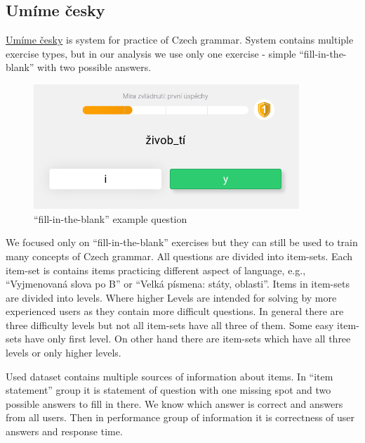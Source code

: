 \documentclass[
  digital, %
  table,   %
  nolof,     %
  nolot,     %
  nocover
]{fithesis3}
\begin{document}
\subsection{Umíme česky}\label{umime-cesky}


\href{https://umimecesky.cz/}{Umíme česky} is system for practice of
Czech grammar. System contains multiple exercise types, but in our
analysis we use only one exercise - simple ``fill-in-the-blank'' with
two possible answers.

\begin{figure}
  \begin{center}
    \includegraphics[width=10cm]{img/umimecesky_doplnovacka}
  \end{center}
  \caption{``fill-in-the-blank'' example question}
  \label{fig:umimeceskydoplnovacka}
\end{figure}

We focused only on ``fill-in-the-blank'' exercises but they can still be
used to train many concepts of Czech grammar. All questions are divided into item-sets. Each item-set is contains items practicing different aspect of language, e.g., ``Vyjmenovaná slova po B'' or ``Velká písmena: státy, oblasti''. Items in item-sets are divided into levels. Where higher Levels are intended for solving by more experienced users as they contain more difficult questions. In general there are three difficulty levels but not all item-sets have all three of them. Some easy item-sets have only first level. On other hand there are item-sets which have all three levels or only higher levels.


Used dataset contains multiple sources of information about items. In ``item statement'' group it is statement of question with one missing spot and two possible answers to fill in there. We know which answer is correct and answers from all users. Then in performance group of information it is correctness of user answers and response time.
\end{document}
